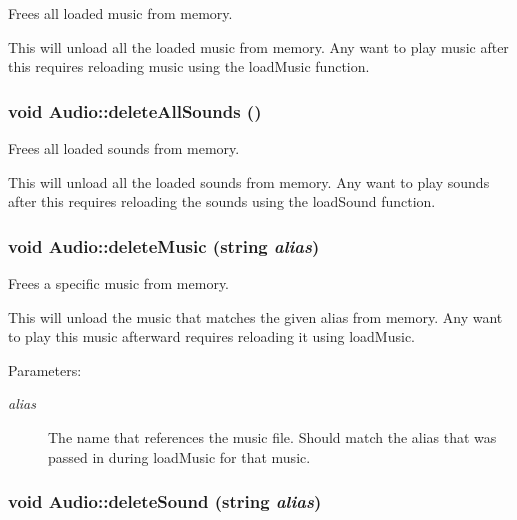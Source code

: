 Frees all loaded music from memory. 

This will unload all the loaded music from memory. Any want to play music after this requires reloading music using the loadMusic function. \hypertarget{class_audio_4ba9968ef82a1a0f5194898a734dfaa1}{
\subsubsection[{deleteAllSounds}]{\setlength{\rightskip}{0pt plus 5cm}void Audio::deleteAllSounds ()}}
\label{class_audio_4ba9968ef82a1a0f5194898a734dfaa1}


Frees all loaded sounds from memory. 

This will unload all the loaded sounds from memory. Any want to play sounds after this requires reloading the sounds using the loadSound function. \hypertarget{class_audio_45c7697fe1e5d1fc2f021121718baf76}{
\subsubsection[{deleteMusic}]{\setlength{\rightskip}{0pt plus 5cm}void Audio::deleteMusic (string {\em alias})}}
\label{class_audio_45c7697fe1e5d1fc2f021121718baf76}


Frees a specific music from memory. 

This will unload the music that matches the given alias from memory. Any want to play this music afterward requires reloading it using loadMusic. \begin{Desc}
\item[Parameters:]
\begin{description}
\item[{\em alias}]The name that references the music file. Should match the alias that was passed in during loadMusic for that music. \end{description}
\end{Desc}
\hypertarget{class_audio_5ae8b89e7f43bd9122be714aedece488}{
\subsubsection[{deleteSound}]{\setlength{\rightskip}{0pt plus 5cm}void Audio::deleteSound (string {\em alias})}}
\label{class_audio_5ae8b89e7f43bd9122be714aedece488}


